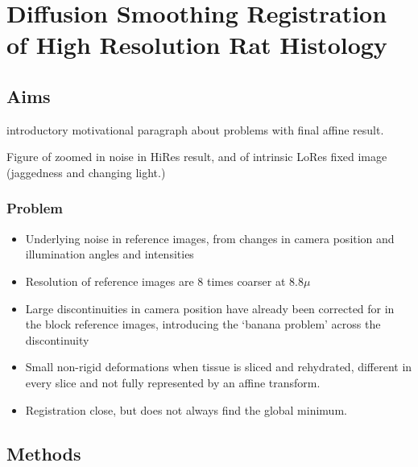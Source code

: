 \chapter{Diffusion Smoothing Registration of High Resolution Rat Histology}
\dblspace
\begin{quote}{\em }\end{quote}

\section{Aims} %
\label{sec:aims}
  introductory motivational paragraph about problems with final affine result.

  Figure of zoomed in noise in HiRes result, and of intrinsic LoRes fixed image (jaggedness and changing light.)
  \subsection{Problem}
    \begin{itemize}
      \item Underlying noise in reference images, from changes in camera position and illumination angles and intensities
      \item Resolution of reference images are 8 times coarser at 8.8$\mu$ 
      \item Large discontinuities in camera position have already been corrected for in the block reference images, introducing the `banana problem' across the discontinuity
      \item Small non-rigid deformations when tissue is sliced and rehydrated, different in every slice and not fully represented by an affine transform.
      \item Registration close, but does not always find the global minimum.
    \end{itemize}


\section{Methods} %
\label{sec:methods}
